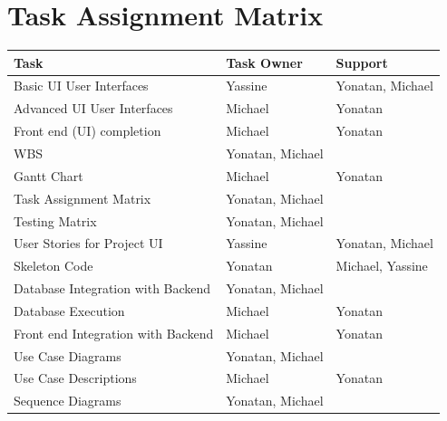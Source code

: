 \documentclass[11pt]{article}
\begin{document}
    
    \pagebreak


    \section{Task Assignment Matrix}\label{sec:task-assignment-matrix}
    \begin{table}[H]
        \centering
        \begin{tabular}{lll}
            \toprule
            \textbf{Task}                      & \textbf{Task Owner} & \textbf{Support} \\
            \midrule
            Basic UI User Interfaces           & Yassine             & Yonatan, Michael \\
            Advanced UI User Interfaces        & Michael             & Yonatan          \\
            Front end (UI) completion          & Michael             & Yonatan          \\
            WBS                                & Yonatan, Michael    &                  \\
            Gantt Chart                        & Michael             & Yonatan          \\
            Task Assignment Matrix             & Yonatan, Michael    &                  \\
            Testing Matrix                     & Yonatan, Michael    &                  \\
            User Stories for Project UI        & Yassine             & Yonatan, Michael \\
            Skeleton Code                      & Yonatan             & Michael, Yassine \\
            Database Integration with Backend  & Yonatan, Michael    &                  \\
            Database Execution                 & Michael             & Yonatan          \\
            Front end Integration with Backend & Michael             & Yonatan          \\
            Use Case Diagrams                  & Yonatan, Michael    &                  \\
            Use Case Descriptions              & Michael             & Yonatan          \\
            Sequence Diagrams                  & Yonatan, Michael    &                  \\

\end{tabular}
\end{table}
\end{document}
